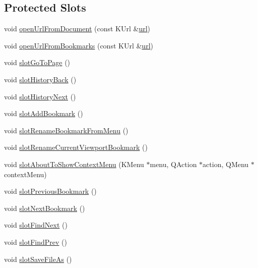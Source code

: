 \subsection*{Protected Slots}
\begin{DoxyCompactItemize}
\item 
void \hyperlink{classOkular_1_1Part_a95dad8c98085c2a00d68864bb967140d}{open\+Url\+From\+Document} (const K\+Url \&\hyperlink{classKParts_1_1ReadOnlyPart_a5b8edbf05a338814287496882adde559}{url})
\item 
void \hyperlink{classOkular_1_1Part_acee955a7465dfe165af05438ba879688}{open\+Url\+From\+Bookmarks} (const K\+Url \&\hyperlink{classKParts_1_1ReadOnlyPart_a5b8edbf05a338814287496882adde559}{url})
\item 
void \hyperlink{classOkular_1_1Part_aa073366bcac831a276e4cded2c9af057}{slot\+Go\+To\+Page} ()
\item 
void \hyperlink{classOkular_1_1Part_ac5e7f665b0fc0310285026d9ec6fab2d}{slot\+History\+Back} ()
\item 
void \hyperlink{classOkular_1_1Part_a7225b627d5268dc6962b41126b8cfd48}{slot\+History\+Next} ()
\item 
void \hyperlink{classOkular_1_1Part_a06fea034f8586ef1116ff45d607c9b66}{slot\+Add\+Bookmark} ()
\item 
void \hyperlink{classOkular_1_1Part_ad7f3a88a5122bb03cb65769e9ffd8033}{slot\+Rename\+Bookmark\+From\+Menu} ()
\item 
void \hyperlink{classOkular_1_1Part_aae8bafbf290fff32fbc720f7e0b39fbc}{slot\+Rename\+Current\+Viewport\+Bookmark} ()
\item 
void \hyperlink{classOkular_1_1Part_a69d3fcf9f03cee6ad8dce67f17b1fb35}{slot\+About\+To\+Show\+Context\+Menu} (K\+Menu $\ast$menu, Q\+Action $\ast$action, Q\+Menu $\ast$context\+Menu)
\item 
void \hyperlink{classOkular_1_1Part_a33c5dd6bc4bd98fc60f3f742eeb5f1f6}{slot\+Previous\+Bookmark} ()
\item 
void \hyperlink{classOkular_1_1Part_ae8575db70c0b634a35acbf655fd85299}{slot\+Next\+Bookmark} ()
\item 
void \hyperlink{classOkular_1_1Part_a5441e55adf5c3c053193d1d4727c5b8a}{slot\+Find\+Next} ()
\item 
void \hyperlink{classOkular_1_1Part_a2fcec80890025dbca52c59b07a46bffd}{slot\+Find\+Prev} ()
\item 
void \hyperlink{classOkular_1_1Part_a39666669036a5786971d4f335ae83851}{slot\+Save\+File\+As} ()
\item 

\end{DoxyCompactItemize}
